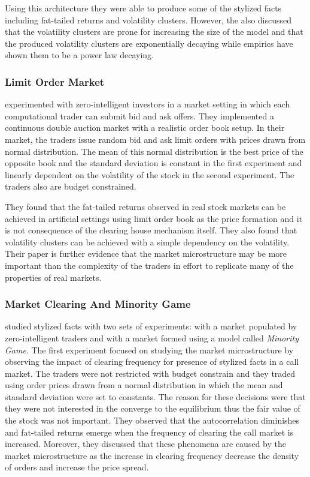Using this architecture they were able to produce some of the stylized facts
including fat-tailed returns and volatility clusters. However, the also discussed
that the volatility clusters are prone for increasing the size of the model and
that the produced volatility clusters are exponentially decaying while empirics have
shown them to be a power law decaying.

\subsubsection{Limit Order Market}
\citet{Raberto05} experimented with zero-intelligent investors in a market setting
in which each computational trader can submit bid and ask offers. They
implemented a continuous double auction market with a realistic order
book setup. In their market, the traders issue random bid and ask limit
orders with prices drawn from normal distribution. The mean of this 
normal distribution is the best price of the opposite book and the 
standard deviation is constant in the first experiment and linearly 
dependent on the volatility of the stock in the second experiment. The
traders also are budget constrained. 

They found that the fat-tailed returns observed in
real stock markets can be achieved in artificial settings using limit 
order book as the price formation and it is not consequence of the clearing 
house mechanism itself. They also found that volatility clusters can
be achieved with a simple dependency on the volatility. Their paper
is further evidence that the market microstructure may be more
important than the complexity of the traders in effort to replicate
many of the properties of real markets.

\subsubsection{Market Clearing And Minority Game}

\citet{LIU20082535} studied stylized facts with two sets of experiments: with
a market populated by zero-intelligent traders and with a market formed using 
a model called \textit{Minority Game}. The first experiment focused on studying
the market microstructure by observing the impact of clearing frequency for 
presence of stylized facts in a call market. The traders were not restricted with budget 
constrain and they traded using order prices drawn from a normal distribution 
in which the mean and standard deviation were set to constants. The reason 
for these decisions were that they were not interested in the converge to 
the equilibrium thus the fair value of the stock was not important. They 
observed that the autocorrelation diminishes and fat-tailed returns emerge 
when the frequency of clearing the call market is increased. Moreover,
they discussed that these phenomena are caused by the market microstructure
as the increase in clearing frequency decrease the density of orders and 
increase the price spread.

